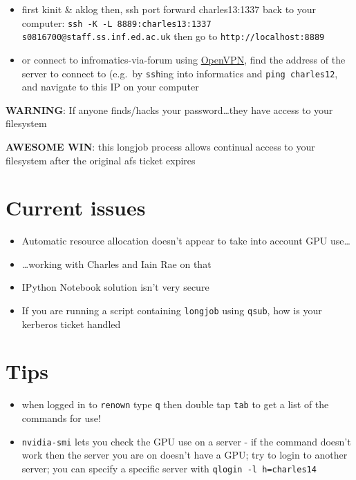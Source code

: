 \documentclass[]{article}
\begin{document}
\begin{enumerate}
\begin{itemize}
    \begin{itemize}
    \itemsep1pt\parskip0pt
    \item
      first kinit \& aklog then, ssh port forward charles13:1337 back to
      your computer:
      \texttt{ssh -K -L 8889:charles13:1337 s0816700@staff.ss.inf.ed.ac.uk}
      then go to \texttt{http://localhost:8889}
    \item
      or connect to infromatics-via-forum using
      \href{http://computing.help.inf.ed.ac.uk/openvpn}{OpenVPN}, find
      the address of the server to connect to (e.g.~by \texttt{ssh}ing
      into informatics and \texttt{ping charles12}, and navigate to this
      IP on your computer
    \end{itemize}
  \end{itemize}
\end{enumerate}

{\textbf{WARNING}}: If anyone finds/hacks your password\ldots{}they have
access to your filesystem

\textbf{AWESOME WIN}: this longjob process allows continual access to
your filesystem after the original afs ticket expires

\section{Current issues}\label{current-issues}

\begin{itemize}
\itemsep1pt\parskip0pt
\item
  Automatic resource allocation doesn't appear to take into account GPU
  use\ldots{}
\item
  \ldots{}working with Charles and Iain Rae on that
\item
  IPython Notebook solution isn't very secure
\item
  If you are running a script containing \texttt{longjob} using
  \texttt{qsub}, how is your kerberos ticket handled
\end{itemize}

\section{Tips}\label{tips}

\begin{itemize}
\itemsep1pt\parskip0pt
\item
  when logged in to \texttt{renown} type \texttt{q} then double tap
  \texttt{tab} to get a list of the commands for use!
\item
  \texttt{nvidia-smi} lets you check the GPU use on a server - if the
  command doesn't work then the server you are on doesn't have a GPU;
  try to login to another server; you can specify a specific server with
  \texttt{qlogin -l h=charles14}
\end{itemize}
\end{document}
